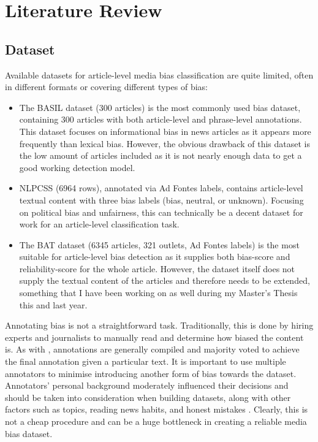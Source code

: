 \chapter{Literature Review}
\label{cha:3}

\section{Dataset}

Available datasets for article-level media bias classification are quite limited, often in different formats or covering different types of bias:
\begin{itemize}
    \item The BASIL dataset \cite{fan-2019-basil} (300 articles) is the most commonly used bias dataset, containing 300 articles with both article-level and phrase-level annotations. This dataset focuses on informational bias in news articles as it appears more frequently than lexical bias. However, the obvious drawback of this dataset is the low amount of articles included as it is not nearly enough data to get a good working detection model.
    \item NLPCSS \cite{chen-2020-nlpcss} (6964 rows), annotated via Ad Fontes labels, contains article-level textual content with three bias labels (bias, neutral, or unknown). Focusing on political bias and unfairness, this can technically be a decent dataset for work for an article-level classification task.
    \item The BAT \cite{spinde-2023-bat} dataset (6345 articles, 321 outlets, Ad Fontes labels) is the most suitable for article-level bias detection as it supplies both bias-score and reliability-score for the whole article. However, the dataset itself does not supply the textual content of the articles and therefore needs to be extended, something that I have been working on as well during my Master's Thesis this and last year.
\end{itemize}

Annotating bias is not a straightforward task. Traditionally, this is done by hiring experts and journalists to manually read and determine how biased the content is. As with \cite{spinde-2021-babe}, annotations are generally compiled and majority voted to achieve the final annotation given a particular text. It is important to use multiple annotators to minimise introducing another form of bias towards the dataset. Annotators' personal background moderately influenced their decisions and should be taken into consideration when building datasets, along with other factors such as topics, reading news habits, and honest mistakes \cite{spinde-2021-bias-words}. Clearly, this is not a cheap procedure and can be a huge bottleneck in creating a reliable media bias dataset.


